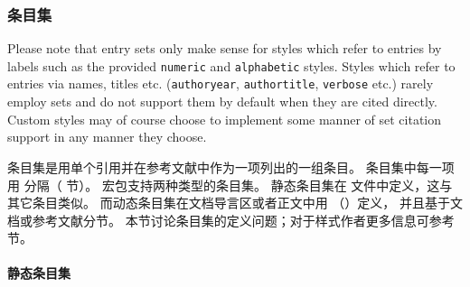 \subsubsection{条目集}%
\label{use:use:set}


 Please note that entry sets only make sense for styles which refer to entries by labels such as the provided \texttt{numeric} and \texttt{alphabetic} styles. Styles which refer to entries via names, titles etc. (\texttt{authoryear}, \texttt{authortitle}, \texttt{verbose} etc.) rarely employ sets and do not support them by default when they are cited directly. Custom styles may of course choose to implement some manner of set citation support in any manner they choose.

条目集是用单个引用并在参考文献中作为一项列出的一组条目。
条目集中每一项用  分隔（ 节）。
\biblatex 宏包支持两种类型的条目集。
静态条目集在  文件中定义，这与其它条目类似。
而动态条目集在文档导言区或者正文中用  （）定义，
并且基于文档或参考文献分节。
本节讨论条目集的定义问题；对于样式作者更多信息可参考  节。

\paragraph{静态条目集}%


